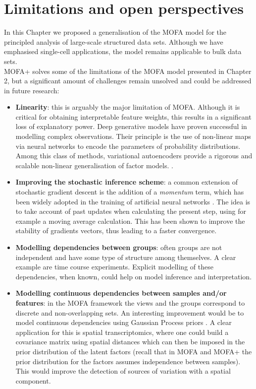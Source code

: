 \section{Limitations and open perspectives}

In this Chapter we proposed a generalisation of the MOFA model for the principled analysis of large-scale structured data sets. Although we have emphasised single-cell applications, the model remains applicable to bulk data sets.\\
MOFA+ solves some of the limitations of the MOFA model presented in Chapter 2, but a significant amount of challenges remain unsolved and could be addressed in future research:

\begin{itemize}
	\item \textbf{Linearity}: this is arguably the major limitation of MOFA. Although it is critical for obtaining interpretable feature weights, this results in a significant loss of explanatory power. Deep generative models have proven successful in modelling complex observations. Their principle is the use of non-linear maps via neural networks to encode the parameters of probability distributions. Among this class of methods, variational autoencoders provide a rigorous and scalable non-linear generalisation of factor models. \cite{Ainsworth2018}.

	\item \textbf{Improving the stochastic inference scheme}: a common extension of stochastic gradient descent is the addition of a \textit{momentum} term, which has been widely adopted in the training of artificial neural networks \cite{Zeiler2012,Ning1999}. The idea is to take account of past updates when calculating the present step, using for example a moving average calculation. This has been shown to improve the stability of gradients vectors, thus leading to a faster convergence.

	\item \textbf{Modelling dependencies between groups}: often groups are not independent and have some type of structure among themselves. A clear example are time course experiments. Explicit modelling of these dependencies, when known, could help on model inference and interpretation.

	\item \textbf{Modelling continuous dependencies between samples and/or features}: in the MOFA framework the views and the groups correspond to discrete and non-overlapping sets. An interesting improvement would be to model continuous dependencies using Gaussian Process priors \cite{Casale2018}. A clear application for this is spatial transcriptomics, where one could build a covariance matrix using spatial distances which can then be imposed in the prior distribution of the latent factors (recall that in MOFA and MOFA+ the prior distribution for the factors assumes independence between samples). This would improve the detection of sources of variation with a spatial component.
\end{itemize}